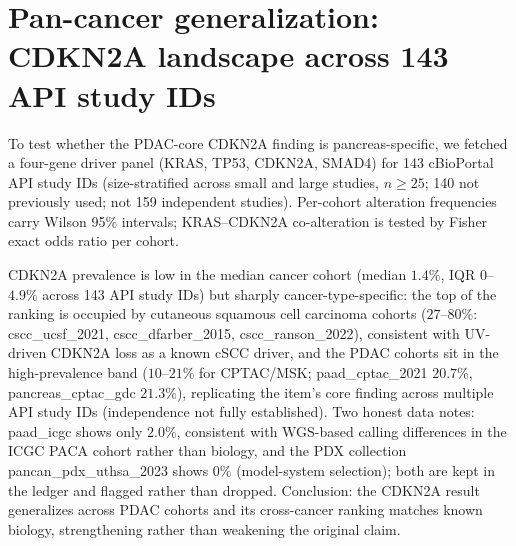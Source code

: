 \section{Pan-cancer generalization: CDKN2A landscape across 143 API study IDs}
To test whether the PDAC-core CDKN2A finding is pancreas-specific, we fetched a
four-gene driver panel (KRAS, TP53, CDKN2A, SMAD4) for 143 cBioPortal API study IDs
(size-stratified across small and large studies, $n\ge25$; 140 not previously
used; not 159 independent studies). Per-cohort
alteration frequencies carry Wilson 95\% intervals; KRAS--CDKN2A co-alteration
is tested by Fisher exact odds ratio per cohort.
\begin{table}[h]\centering\small

\caption{Top cohorts by CDKN2A alteration frequency (full per-cohort table in
\texttt{results/pancan\_cdkn2a.json}).}
\end{table}
CDKN2A prevalence is low in the median cancer cohort (median $1.4\%$, IQR
$0$--$4.9\%$ across 143 API study IDs) but sharply cancer-type-specific: the top of
the ranking is occupied by cutaneous squamous cell carcinoma cohorts
($27$--$80\%$: cscc\_ucsf\_2021, cscc\_dfarber\_2015, cscc\_ranson\_2022),
consistent with UV-driven CDKN2A loss as a known cSCC driver, and the PDAC
cohorts sit in the high-prevalence band ($10$--$21\%$ for CPTAC/MSK;
paad\_cptac\_2021 $20.7\%$, pancreas\_cptac\_gdc $21.3\%$), replicating the
item's core finding across multiple API study IDs (independence not fully established). Two honest data notes:
paad\_icgc shows only $2.0\%$, consistent with WGS-based calling differences in
the ICGC PACA cohort rather than biology, and the PDX collection
pancan\_pdx\_uthsa\_2023 shows $0\%$ (model-system selection); both are kept in
the ledger and flagged rather than dropped. Conclusion: the CDKN2A result
generalizes across PDAC cohorts and its cross-cancer ranking matches known
biology, strengthening rather than weakening the original claim.
